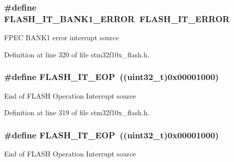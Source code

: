 \subsubsection[{\texorpdfstring{F\+L\+A\+S\+H\+\_\+\+I\+T\+\_\+\+B\+A\+N\+K1\+\_\+\+E\+R\+R\+OR}{FLASH_IT_BANK1_ERROR}}]{\setlength{\rightskip}{0pt plus 5cm}\#define F\+L\+A\+S\+H\+\_\+\+I\+T\+\_\+\+B\+A\+N\+K1\+\_\+\+E\+R\+R\+OR~{\bf F\+L\+A\+S\+H\+\_\+\+I\+T\+\_\+\+E\+R\+R\+OR}}\hypertarget{group___f_l_a_s_h___interrupts_ga808627239be1bf9c2d8bfed36ec4db19}{}\label{group___f_l_a_s_h___interrupts_ga808627239be1bf9c2d8bfed36ec4db19}
F\+P\+EC B\+A\+N\+K1 error interrupt source 

Definition at line 320 of file stm32f10x\+\_\+flash.\+h.

\subsubsection[{\texorpdfstring{F\+L\+A\+S\+H\+\_\+\+I\+T\+\_\+\+E\+OP}{FLASH_IT_EOP}}]{\setlength{\rightskip}{0pt plus 5cm}\#define F\+L\+A\+S\+H\+\_\+\+I\+T\+\_\+\+E\+OP~(({\bf uint32\+\_\+t})0x00001000)}\hypertarget{group___f_l_a_s_h___interrupts_gaea20e80e1806d58a7544cfe8659e7f11}{}\label{group___f_l_a_s_h___interrupts_gaea20e80e1806d58a7544cfe8659e7f11}
End of F\+L\+A\+SH Operation Interrupt source 

Definition at line 319 of file stm32f10x\+\_\+flash.\+h.

\subsubsection[{\texorpdfstring{F\+L\+A\+S\+H\+\_\+\+I\+T\+\_\+\+E\+OP}{FLASH_IT_EOP}}]{\setlength{\rightskip}{0pt plus 5cm}\#define F\+L\+A\+S\+H\+\_\+\+I\+T\+\_\+\+E\+OP~(({\bf uint32\+\_\+t})0x00001000)}\hypertarget{group___f_l_a_s_h___interrupts_gaea20e80e1806d58a7544cfe8659e7f11}{}\label{group___f_l_a_s_h___interrupts_gaea20e80e1806d58a7544cfe8659e7f11}
End of F\+L\+A\+SH Operation Interrupt source 

